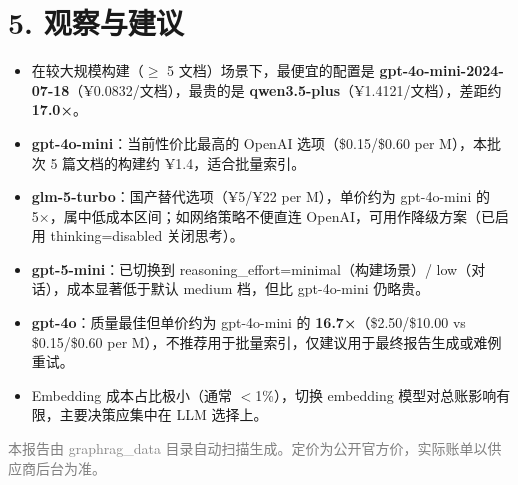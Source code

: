 \documentclass[11pt]{article}
\begin{document}
\section*{5. 观察与建议}
\begin{itemize}[leftmargin=*]
  \item 在较大规模构建（$\geq$ 5 文档）场景下，最便宜的配置是 \textbf{gpt-4o-mini-2024-07-18}（¥0.0832/文档），最贵的是 \textbf{qwen3.5-plus}（¥1.4121/文档），差距约 \textbf{17.0×}。
  \item \textbf{gpt-4o-mini}：当前性价比最高的 OpenAI 选项（\$0.15/\$0.60 per M），本批次 5 篇文档的构建约 ¥1.4，适合批量索引。
  \item \textbf{glm-5-turbo}：国产替代选项（¥5/¥22 per M），单价约为 gpt-4o-mini 的 5×，属中低成本区间；如网络策略不便直连 OpenAI，可用作降级方案（已启用 thinking=disabled 关闭思考）。
  \item \textbf{gpt-5-mini}：已切换到 reasoning\_effort=minimal（构建场景）/ low（对话），成本显著低于默认 medium 档，但比 gpt-4o-mini 仍略贵。
  \item \textbf{gpt-4o}：质量最佳但单价约为 gpt-4o-mini 的 \textbf{16.7×}（\$2.50/\$10.00 vs \$0.15/\$0.60 per M），\textcolor{warnorange}{不推荐用于批量索引}，仅建议用于最终报告生成或难例重试。
  \item Embedding 成本占比极小（通常 $<$1\%），切换 embedding 模型对总账影响有限，主要决策应集中在 LLM 选择上。
\end{itemize}
\vfill
\begin{center}\small\textcolor{gray}{本报告由 graphrag\_data 目录自动扫描生成。定价为公开官方价，实际账单以供应商后台为准。}\end{center}
\end{document}

